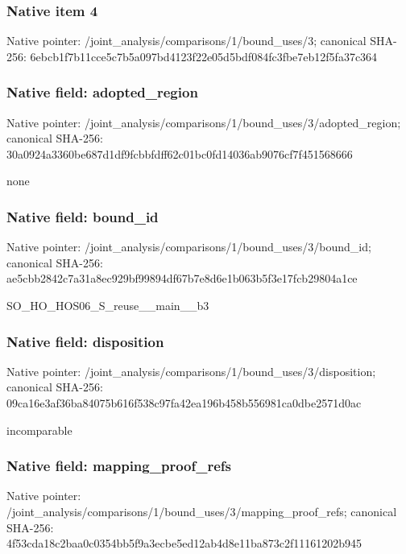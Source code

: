 \documentclass[10pt,a4paper]{article}
\begin{document}
\subsubsection{Native item 4}
Native pointer: /joint\_\allowbreak{}analysis/comparisons/1/bound\_\allowbreak{}uses/3; canonical SHA-256: 6ebcb1f7b11cce5c7b5a097bd4123f22e05d5bdf084fc3fbe7eb12f5fa37c364

\subsubsection{Native field: adopted\_\allowbreak{}region}
Native pointer: /joint\_\allowbreak{}analysis/comparisons/1/bound\_\allowbreak{}uses/3/adopted\_\allowbreak{}region; canonical SHA-256: 30a0924a3360be687d1df9fcbbfdff62c01bc0fd14036ab9076cf7f451568666

\begingroup\raggedright\sloppy none\par\endgroup

\subsubsection{Native field: bound\_\allowbreak{}id}
Native pointer: /joint\_\allowbreak{}analysis/comparisons/1/bound\_\allowbreak{}uses/3/bound\_\allowbreak{}id; canonical SHA-256: ae5cbb2842c7a31a8ec929bf99894df67b7e8d6e1b063b5f3e17fcb29804a1ce

\begingroup\raggedright\sloppy SO\_\allowbreak{}HO\_\allowbreak{}HOS06\_\allowbreak{}S\_\allowbreak{}reuse\_\allowbreak{}\_\allowbreak{}main\_\allowbreak{}\_\allowbreak{}b3\par\endgroup

\subsubsection{Native field: disposition}
Native pointer: /joint\_\allowbreak{}analysis/comparisons/1/bound\_\allowbreak{}uses/3/disposition; canonical SHA-256: 09ca16e3af36ba84075b616f538c97fa42ea196b458b556981ca0dbe2571d0ac

\begingroup\raggedright\sloppy incomparable\par\endgroup

\subsubsection{Native field: mapping\_\allowbreak{}proof\_\allowbreak{}refs}
Native pointer: /joint\_\allowbreak{}analysis/comparisons/1/bound\_\allowbreak{}uses/3/mapping\_\allowbreak{}proof\_\allowbreak{}refs; canonical SHA-256: 4f53cda18c2baa0c0354bb5f9a3ecbe5ed12ab4d8e11ba873c2f11161202b945
\end{document}
